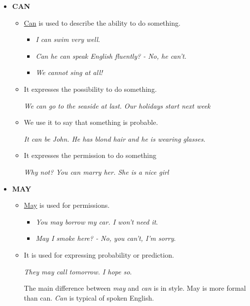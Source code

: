\begin{itemize}

\item\textbf{CAN}

\begin{itemize}

\item \underline{Can} is used to describe the ability to do something.
\begin{itemize}
\item \textit{I can swim very well}.
\item \textit{Can he can speak English fluently? - No, he can't}.
\item \textit{We cannot sing at all!}
\end{itemize}

\item It expresses the possibility to do something.

\textit{We can go to the seaside at last. Our holidays start next week}

\item We use it to say that something is probable.

\textit{It can be John. He has blond hair and he is wearing glasses}.

\item It expresses the permission to do something

\textit{Why not? You can marry her. She is a nice girl}

\end{itemize}

\item\textbf{MAY}

\begin{itemize}

\item \underline{May} is used for permissions.

\begin{itemize}
\item\textit{You may borrow my car. I won't need it}.
\item\textit{May I smoke here? - No, you can't, I'm sorry}.
\end{itemize}

\item It is used for expressing probability or prediction.

\textit{They may call tomorrow. I hope so}.

The main difference between \textit{may} and \textit{can} is in style. May is more formal than can. \textit{Can} is typical of spoken English.


\end{itemize}
\end{itemize}
